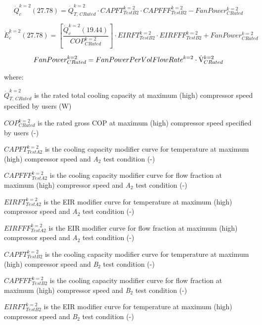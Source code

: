 \begin{equation}
  \dot Q_c^{k = 2}(27.78) = \dot Q_{T,\,CRated}^{k = 2} \cdot CAPFT_{TestB2}^{k = 2} \cdot CAPFFF_{TestB2}^{k = 2} - FanPower_{CRated}^{k = 2}
\end{equation}

\begin{equation}
  \dot E_c^{k = 2}(27.78) = \left[ {\frac{{\dot Q_c^{k = 2}(19.44)}}{{COP_{CRated}^{k = 2}}}} \right] \cdot EIRFT_{TestB2}^{k = 2} \cdot EIRFFF_{TestB2}^{k = 2} + FanPower_{CRated}^{k = 2}
\end{equation}

\begin{equation}
  FanPower_{CRated}^{k = 2} = FanPowerPerVolFlowRat{e^{k = 2}} \cdot {\rm{\dot V}}_{CRated}^{k = 2}
\end{equation}

where:

\(\dot Q_{T,\,CRated}^{k = 2}\) is the rated total cooling capacity at maximum (high) compressor speed specified by users (W)

\(COP_{CRated}^{k = 2}\) is the rated gross COP at maximum (high) compressor speed specified by users (-)

\(CAPFT_{TestA2}^{k = 2}\) is the cooling capacity modifier curve for temperature at maximum (high) compressor speed and \emph{A}\(_{2}\) test condition (-)

\(CAPFFF_{TestA2}^{k = 2}\) is the cooling capacity modifier curve for flow fraction at maximum (high) compressor speed and \emph{A}\(_{2}\) test condition (-)

\(EIRFT_{TestA2}^{k = 2}\) is the EIR modifier curve for temperature at maximum (high) compressor speed and \emph{A}\(_{2}\) test condition (-)

\(EIRFFF_{TestA2}^{k = 2}\) is the EIR modifier curve for flow fraction at maximum (high)~ compressor speed and \emph{A}\(_{2}\) test condition (-)

\(CAPFT_{TestB2}^{k = 2}\) is the cooling capacity modifier curve for temperature at maximum (high) compressor speed and \emph{B}\(_{2}\) test condition (-)

\(CAPFFF_{TestB2}^{k = 2}\) is the cooling capacity modifier curve for flow fraction at maximum (high) compressor speed and \emph{B}\(_{2}\) test condition (-)

\(EIRFT_{TestB2}^{k = 2}\) is the EIR modifier curve for temperature at maximum (high) compressor speed and \emph{B}\(_{2}\) test condition (-)

